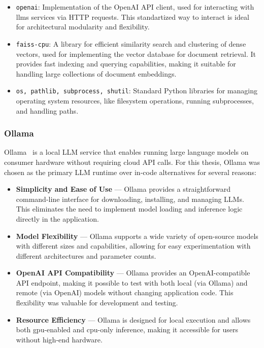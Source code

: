 \begin{itemize}
  \item \texttt{openai}: Implementation of the OpenAI API client,
    used for interacting with \glspl{llm} services via HTTP requests.
    This standartized way to interact is ideal for architectural
    modularity and flexibility.
  \item \texttt{faiss-cpu}: A library for efficient similarity search
    and clustering of dense vectors, used for implementing the vector
    database for document retrieval. It provides fast indexing and
    querying capabilities, making it suitable for handling large
    collections of document embeddings.
  \item \texttt{os, pathlib, subprocess, shutil}: Standard Python
    libraries for managing operating system resources, like
    filesystem operations, running subprocesses, and handling paths.
\end{itemize}

\subsubsection{Ollama}

Ollama~\cite{ollama-web} is a local LLM service that enables running large
language models on consumer hardware without requiring cloud API calls. For this
thesis, Ollama was chosen as the primary LLM runtime over in-code alternatives
for several reasons:

\begin{itemize}
  \item \textbf{Simplicity and Ease of Use} --- Ollama provides a
    straightforward command-line interface for downloading,
    installing, and managing LLMs. This eliminates the need to
    implement model loading and inference logic directly in the application.

  \item \textbf{Model Flexibility} --- Ollama supports a wide variety
    of open-source models with different sizes and capabilities,
    allowing for easy experimentation with different architectures
    and parameter counts.

  \item \textbf{OpenAI API Compatibility} --- Ollama provides an
    OpenAI-compatible API endpoint, making it possible to test with
    both local (via Ollama) and remote (via OpenAI) models without
    changing application code. This flexibility was valuable for
    development and testing.

  \item \textbf{Resource Efficiency} --- Ollama is designed for local
    execution and allows both \gls{gpu}-enabled and \gls{cpu}-only
    inference, making it accessible for users without high-end hardware.
\end{itemize}

